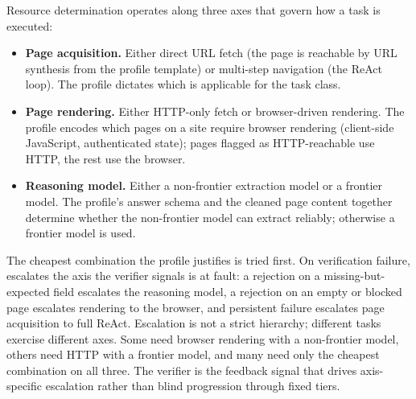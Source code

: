 

Resource determination operates along three axes that govern how
a task is executed:
\begin{sloppypar}
\begin{itemize}
    \item \textbf{Page acquisition.} Either direct URL fetch
    (the page is reachable by URL synthesis from the profile
    template) or multi-step navigation (the ReAct loop). The
    profile dictates which is applicable for the task class.
    \item \textbf{Page rendering.} Either HTTP-only fetch or
    browser-driven rendering. The profile encodes which pages
    on a site require browser rendering (client-side JavaScript,
    authenticated state); pages flagged as HTTP-reachable use
    HTTP, the rest use the browser.
    \item \textbf{Reasoning model.} Either a non-frontier
    extraction model or a frontier model. The profile's answer
    schema and the cleaned page content together determine
    whether the non-frontier model can extract reliably; otherwise a frontier model is used.
\end{itemize}
\end{sloppypar}

The cheapest combination the profile justifies is tried first.
On verification failure, \sys{} escalates the axis the verifier
signals is at fault: a rejection on a missing-but-expected field
escalates the reasoning model, a rejection on an empty or blocked
page escalates rendering to the browser, and persistent failure
escalates page acquisition to full ReAct. Escalation is not a
strict hierarchy; different tasks exercise different axes. Some
need browser rendering with a non-frontier model, others need
HTTP with a frontier model, and many need only the cheapest
combination on all three. The verifier is the feedback signal
that drives axis-specific escalation rather than blind progression
through fixed tiers.


